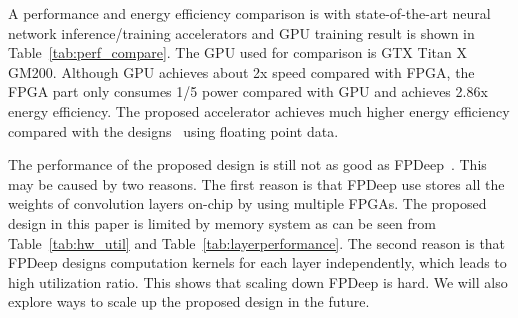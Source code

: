 A performance and energy efficiency comparison is with state-of-the-art neural network inference/training accelerators and GPU training result is shown in Table~\ref{tab:perf_compare}. The GPU used for comparison is GTX Titan X GM200. Although GPU achieves about 2x speed compared with FPGA, the FPGA part only consumes 1/5 power compared with GPU and achieves 2.86x energy efficiency. The proposed accelerator achieves much higher energy efficiency compared with the designs~\cite{liu2017fpga, zhao2016f} using floating point data.



The performance of the proposed design is still not as good as FPDeep~\cite{geng2018fpdeep}. This may be caused by two reasons. The first reason is that FPDeep use stores all the weights of convolution layers on-chip by using multiple FPGAs. The proposed design in this paper is limited by memory system as can be seen from Table~\ref{tab:hw_util} and Table~\ref{tab:layerperformance}. The second reason is that FPDeep designs computation kernels for each layer independently, which leads to high utilization ratio. This shows that scaling down FPDeep is hard. We will also explore ways to scale up the proposed design in the future.









